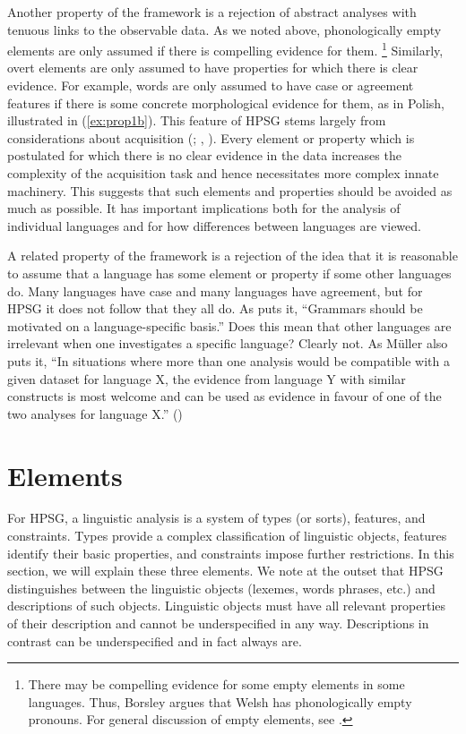 \documentclass[output=paper
	        ,collection
	        ,collectionchapter
 	        ,biblatex
                ,babelshorthands
                ,newtxmath
                ,draftmode
                ,colorlinks, citecolor=brown
]{langscibook}
\begin{document}
Another property of the framework is a rejection of abstract analyses with tenuous links to the observable data. As we noted above, phonologically empty elements are only assumed if there is compelling evidence for them.%
%
\footnote{There may be compelling evidence for some empty elements in some languages. Thus, \citet[section~8]{Borsley2009a-u}Borsley argues that Welsh has phonologically empty pronouns. For general discussion of empty elements, see \citet[chapter~19.2]{MuellerGT-Eng1}.}
%
Similarly, overt elements are only assumed to have properties for which there is clear evidence. For example, words are only assumed to have case or agreement features if there is some concrete morphological evidence for them, as in Polish, illustrated in (\ref{ex:prop1b}). This feature of HPSG stems largely from considerations about acquisition (\citealt[Chapter~19]{MuellerGT-Eng1}; , ). Every element or property which is postulated for which there is no clear evidence in the data increases the complexity of the acquisition task and hence necessitates more complex innate machinery. This suggests that such elements and properties should be avoided as much as possible. It has important implications both for the analysis of individual languages and for how differences between languages are viewed.
	
A related property of the framework is a rejection of the idea that it is reasonable to assume that a language has some element or property if some other languages do. Many languages have case and many languages have agreement, but for HPSG it does not follow that they all do. As \citet[25]{MuellerCoreGram} puts it, “Grammars should be motivated on a language-specific basis.” Does this mean that other languages are irrelevant when one investigates a specific language? Clearly not. As Müller also puts it, “In situations where more than one analysis would be compatible with a given dataset for language X, the evidence from language Y with similar constructs is most welcome and can be used as evidence in favour of one of the two analyses for language X.” (\citeyear[43]{MuellerCoreGram})


\section{Elements}

For HPSG, a linguistic analysis is a system of types (or sorts), features, and constraints. Types provide a complex classification of linguistic objects, features identify their basic properties, and constraints impose further restrictions. In this section, we will explain these three elements. We note at the outset that HPSG distinguishes between the linguistic objects (lexemes, words phrases, etc.) and descriptions of such objects. Linguistic objects must have all relevant properties of their description and cannot be underspecified in any way. Descriptions in contrast can be underspecified and in fact always are.
\end{document}
